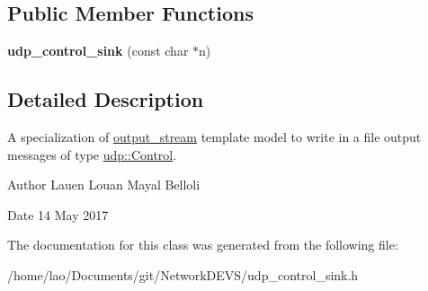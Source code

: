 \subsection*{Public Member Functions}
\begin{DoxyCompactItemize}
\item 
{\bfseries udp\+\_\+control\+\_\+sink} (const char $\ast$n)\hypertarget{classudp__control__sink_a3a5224e02175e0a55590ad1d7009fd61}{}\label{classudp__control__sink_a3a5224e02175e0a55590ad1d7009fd61}

\end{DoxyCompactItemize}


\subsection{Detailed Description}
A specialization of \hyperlink{classoutput__stream}{output\+\_\+stream} template model to write in a file output messages of type \hyperlink{structudp_1_1Control}{udp\+::\+Control}. 

\begin{DoxyAuthor}{Author}
Lauen Louan Mayal Belloli 
\end{DoxyAuthor}
\begin{DoxyDate}{Date}
14 May 2017 
\end{DoxyDate}


The documentation for this class was generated from the following file\+:\begin{DoxyCompactItemize}
\item 
/home/lao/\+Documents/git/\+Network\+D\+E\+V\+S/udp\+\_\+control\+\_\+sink.\+h\end{DoxyCompactItemize}
